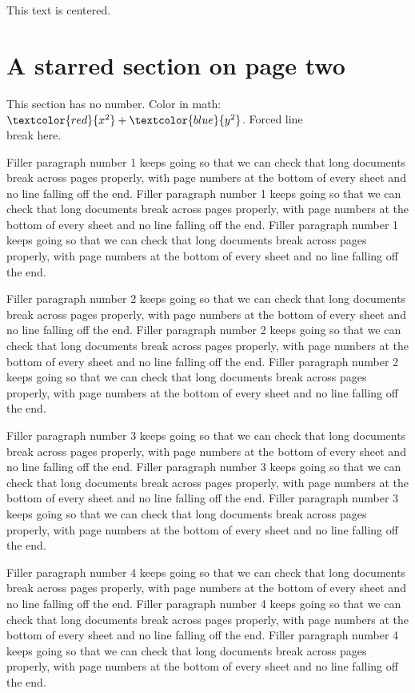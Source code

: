 \documentclass[11pt]{article}
\begin{document}
\begin{center}
This text is centered.
\end{center}

\newpage
\section*{A starred section on page two}
This section has no number. Color in math: $\textcolor{red}{x^2} + \textcolor{blue}{y^2}$.
Forced line\\break here.


Filler paragraph number 1 keeps going so that we can check that long documents break across pages properly, with page numbers at the bottom of every sheet and no line falling off the end. Filler paragraph number 1 keeps going so that we can check that long documents break across pages properly, with page numbers at the bottom of every sheet and no line falling off the end. Filler paragraph number 1 keeps going so that we can check that long documents break across pages properly, with page numbers at the bottom of every sheet and no line falling off the end. 


Filler paragraph number 2 keeps going so that we can check that long documents break across pages properly, with page numbers at the bottom of every sheet and no line falling off the end. Filler paragraph number 2 keeps going so that we can check that long documents break across pages properly, with page numbers at the bottom of every sheet and no line falling off the end. Filler paragraph number 2 keeps going so that we can check that long documents break across pages properly, with page numbers at the bottom of every sheet and no line falling off the end. 


Filler paragraph number 3 keeps going so that we can check that long documents break across pages properly, with page numbers at the bottom of every sheet and no line falling off the end. Filler paragraph number 3 keeps going so that we can check that long documents break across pages properly, with page numbers at the bottom of every sheet and no line falling off the end. Filler paragraph number 3 keeps going so that we can check that long documents break across pages properly, with page numbers at the bottom of every sheet and no line falling off the end. 


Filler paragraph number 4 keeps going so that we can check that long documents break across pages properly, with page numbers at the bottom of every sheet and no line falling off the end. Filler paragraph number 4 keeps going so that we can check that long documents break across pages properly, with page numbers at the bottom of every sheet and no line falling off the end. Filler paragraph number 4 keeps going so that we can check that long documents break across pages properly, with page numbers at the bottom of every sheet and no line falling off the end. 
\end{document}
